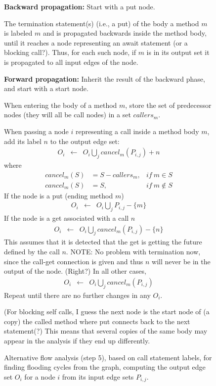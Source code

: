 \documentclass[12pt]{article}%
\begin{document}
\begin{figure}
\begin{shaded}

\textbf{Backward propagation:}
Start with a put node.

The termination statement(s) (i.e., a put) of the  body  a method $m$ 
is labeled $m$ and is propagated backwards 
inside the method body, until it reaches 
a node representing an
await statement (or a blocking call?). 
Thus, for each such node, if  $m$ is in its output set it is 
propagated to  all input edges of the node.



\textbf{Forward propagation:}
Inherit the result of the backward phase, and 
start with a start node.

When entering the body of a method  $m$, store the set of 
predecessor nodes (they will all be call nodes)
in a  set $callers_m$.



When passing a node $i$ representing a call inside a method body $m$, 
add its label $n$ to the output edge set:
$$\begin{array}{lll}
O_i&\leftarrow& O_i \bigcup_j cancel_m(P_{i,j}) + n%
\end{array}$$
where 
$$\begin{array}{lll}
cancel_m(S)&= S - callers_m,& if\ m\in S\\
cancel_m(S)&= S , &if\ m\not\in S%
\end{array}$$
% 
If the node is a put (ending method $m$)
$$\begin{array}{lll}
O_i&\leftarrow& O_i \bigcup_j P_{i,j} - \{m\} %
\end{array}$$
%
If the node is a get associated with a call $n$
$$\begin{array}{lll}
O_i&\leftarrow& O_i \bigcup_j  cancel_m(P_{i,j}) - \{n\}%
\end{array}$$
This assumes that it is detected that the get is getting the future
defined by the call $n$.
{NOTE: No problem with termination  now,
since the call-get  connection is given and thus $n$ will never be 
in the output  of the node. (Right?)}
In all other cases,
$$\begin{array}{lll}
O_i&\leftarrow& O_i \bigcup_j cancel_m(P_{i,j}) %
\end{array}$$
Repeat until there are no further changes in any $O_i$.%

(For blocking self calls, I guess the next node is the start node of (a copy) the 
called method where put connects back to the next statement(?)
This  means that several copies of the same body may appear in the 
analysis if they end up differently.
\end{shaded}%
\caption{\label{step5a}%
Alternative flow analysis (step 5), based on call statement labels, for finding flooding cycles from the graph,
computing the output edge set $O_i$ for a node $i$ from its input edge sets 
$P_{i,j}$.
}
\end{figure}
\end{document}
